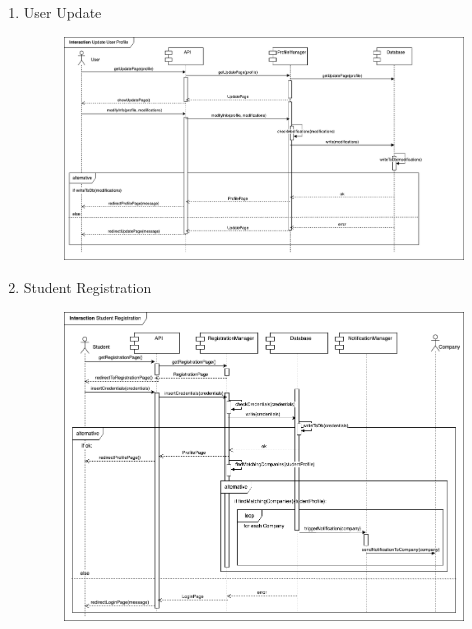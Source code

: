 \begin{enumerate}
    \newpage
    \item User Update
    \begin{figure}[h!]
            \centering  \includegraphics[width=1\textwidth]{DD/Images/Interactions/INT03_UserUpdate.drawio.png}
            \label{fig:ComponentViewDiagram}
    \end{figure}

    \newpage
    \item Student Registration
    \begin{figure}[h!]
            \centering  \includegraphics[width=1\textwidth]{DD/Images/Interactions/INT04_StudentRegistration.drawio.png}
            \label{fig:ComponentViewDiagram}
    \end{figure}


\end{enumerate}
